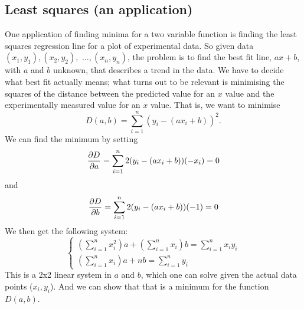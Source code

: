 \subsection{Least squares (an application)}

One application of finding minima for a two variable function is finding the least squares regression line for a plot of experimental data. So given data $(x_1,y_1), (x_2,y_2),$ $\ldots, (x_n,y_n)$, the problem is to find the best fit line, $ax+b$, with $a$ and $b$ unknown, that describes a trend in the data. We have to decide what best fit actually means; what turns out to be relevant is minimising the squares of the distance between the predicted value for an $x$ value and the experimentally measured value for an $x$ value. That is, we want to minimise
\[ D(a,b) = \sum_{i=1}^n (y_i - (ax_i + b))^2. \]
We can find the minimum by setting 
\[ \frac{\partial D}{\partial a} = \sum_{i=1}^n 2(y_i -(ax_i +b))(-x_i) = 0 \]
and
\[ \frac{\partial D}{\partial b} = \sum_{i=1}^n 2(y_i -(ax_i +b))(-1) = 0 \]
We then get the following system:
\[\begin{cases} \left(\sum_{i=1}^n x_i^2\right)a + \left(\sum_{i=1}^n x_i\right)b = \sum_{i=1}^n x_iy_i \\
\left(\sum_{i=1}^n x_i \right)a + nb = \sum_{i=1}^n y_i 
\end{cases}\]
This is a 2x2 linear system in $a$ and $b$, which one can solve given the actual data points ($x_i, y_i$). And we can show that that is a minimum for the function $D(a,b)$. 

